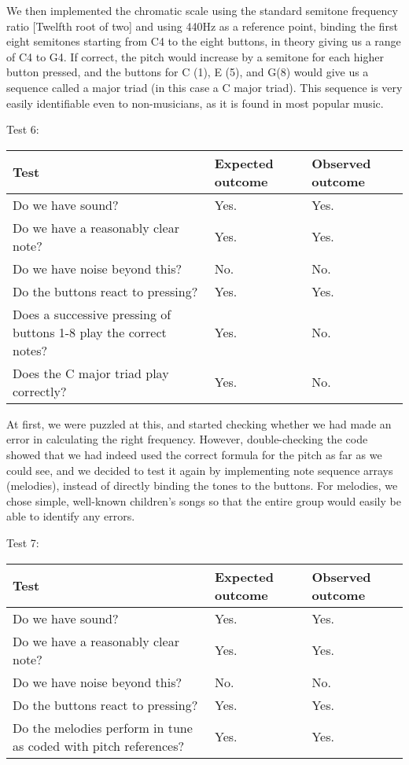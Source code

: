We then implemented the chromatic scale using the standard semitone
frequency ratio [Twelfth root of two] and using 440Hz as a reference
point, binding the first eight semitones starting from C4 to the eight
buttons, in theory giving us a range of C4 to G4. If correct, the pitch
would increase by a semitone for each higher button pressed, and the
buttons for C (1), E (5), and G(8) would give us a sequence called a
major triad (in this case a C major triad). This sequence is very easily identifiable even to
non-musicians, as it is found in most popular music.

Test 6:
\begin{center}
\begin{tabular}{|p{3.6cm}|p{3.6cm}|p{3.6cm}|}
\hline
{\sc Test} & {\sc Expected outcome} & {\sc Observed outcome}\\ \hline
Do we have sound? & Yes. & Yes.\\ \hline
Do we have a reasonably clear note? & Yes. & Yes. \\ \hline
Do we have noise beyond this? & No. & No. \\ \hline
Do the buttons react to pressing? & Yes. & Yes.\\ \hline
Does a successive pressing of buttons 1-8 play the correct notes? & Yes. & No.\\ \hline
Does the C major triad play correctly? & Yes. & No.\\ \hline
\end{tabular}
\end{center}

At first, we were puzzled at this, and started checking whether we had made an error in calculating the right frequency. However, double-checking the code showed that we had indeed used the
correct formula for the pitch as far as we could see, and we
decided to test it again by implementing note sequence arrays
(melodies), instead of directly binding the tones to the buttons. For
melodies, we chose simple, well-known children's songs so that the
entire group would easily be able to identify any errors.

Test 7:
\begin{center}
\begin{tabular}{|p{3.6cm}|p{3.6cm}|p{3.6cm}|}
\hline
{\sc Test} & {\sc Expected outcome} & {\sc Observed outcome}\\ \hline
Do we have sound? & Yes. & Yes.\\ \hline
Do we have a reasonably clear note? & Yes. & Yes. \\ \hline
Do we have noise beyond this? & No. & No. \\ \hline
Do the buttons react to pressing? & Yes. & Yes.\\ \hline
Do the melodies perform in tune as coded with pitch references? & Yes. &
Yes. \\ \hline
\end{tabular}
\end{center}

